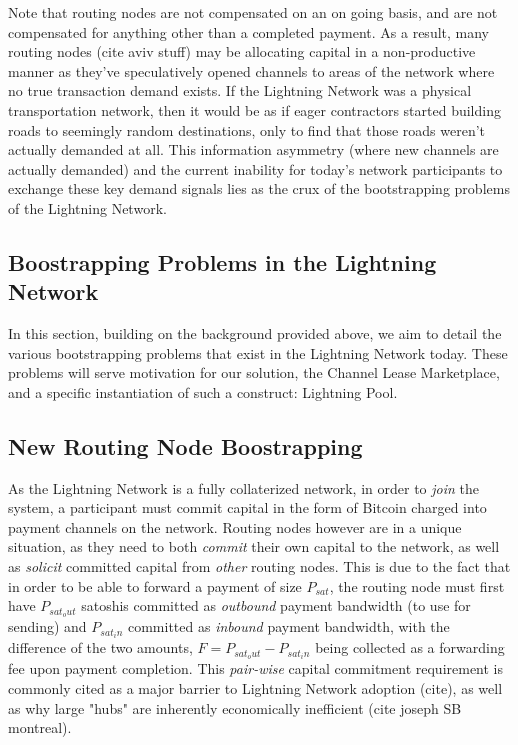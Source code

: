 \documentclass[12pt,a4paper]{article}
\theoremstyle{definition}
\begin{document}
 Note that routing nodes are not compensated on an on going basis, and are not
 compensated for anything other than a completed payment. As a result, many
 routing nodes (cite aviv stuff) may be allocating capital in a non-productive
 manner as they've speculatively opened channels to areas of the network where
 no true transaction demand exists. If the Lightning Network was a physical
 transportation network, then it would be as if eager contractors started
 building roads to seemingly random destinations, only to find that those roads
 weren't actually demanded at all. This information asymmetry (where new
 channels are actually demanded) and the current inability for today's network
 participants to exchange these key demand signals lies as the crux of the
 bootstrapping problems of the Lightning Network. 


\subsection{Boostrapping Problems in the Lightning Network}

In this section, building on the background provided above, we aim to detail
the various bootstrapping problems that exist in the Lightning Network today.
These problems will serve motivation for our solution, the Channel Lease
Marketplace, and a specific instantiation of such a construct: Lightning Pool. 


\subsection{New Routing Node Boostrapping}

As the Lightning Network is a fully collaterized network, in order to
\emph{join} the system, a participant must commit capital in the form of
Bitcoin charged into payment channels on the network. Routing nodes however are
in a unique situation, as they need to both \emph{commit} their own capital to
the network, as well as \emph{solicit} committed capital from \emph{other}
routing nodes. This is due to the fact that in order to be able to forward a
payment of size $P_{sat}$, the routing node must first have $P_{sat_out}$
satoshis committed as \emph{outbound} payment bandwidth (to use for sending)
and $P_{sat_in}$ committed as \emph{inbound} payment bandwidth, with the
difference of the two amounts, $F= P_{sat_out} -  P_{sat_in}$ being collected
as a forwarding fee upon payment completion. This \emph{pair-wise} capital
commitment requirement is commonly cited as a major barrier to Lightning
Network adoption (cite), as well as why large "hubs" are inherently
economically inefficient (cite joseph SB montreal). 
\end{document}
